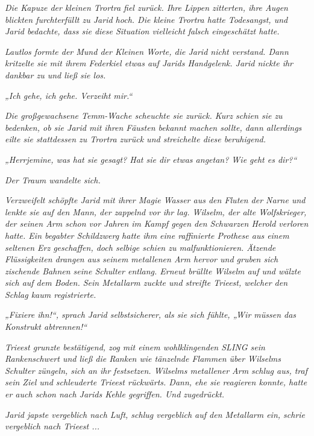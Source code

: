 \textit{Die Kapuze der kleinen Trortra fiel zurück. Ihre Lippen zitterten, ihre Augen blickten furchterfüllt zu Jarid hoch. Die kleine Trortra hatte Todesangst, und Jarid bedachte, dass sie diese Situation vielleicht falsch eingeschätzt hatte.}

\textit{Lautlos formte der Mund der Kleinen Worte, die Jarid nicht verstand. Dann kritzelte sie mit ihrem Federkiel etwas auf Jarids Handgelenk. Jarid nickte ihr dankbar zu und ließ sie los.}

\textit{„Ich gehe, ich gehe. Verzeiht mir.“}

\textit{Die großgewachsene Temm-Wache scheuchte sie zurück. Kurz schien sie zu bedenken, ob sie Jarid mit ihren Fäusten bekannt machen sollte, dann allerdings eilte sie stattdessen zu Trortra zurück und streichelte diese beruhigend.}

\textit{„Herrjemine, was hat sie gesagt? Hat sie dir etwas angetan? Wie geht es dir?“}



\textit{Der Traum wandelte sich.}






\textit{Verzweifelt schöpfte Jarid mit ihrer Magie Wasser aus den Fluten der Narne und lenkte sie auf den Mann, der zappelnd vor ihr lag. Wilselm, der alte Wolfskrieger, der seinen Arm schon vor Jahren im Kampf gegen den Schwarzen Herold verloren hatte. Ein begabter Schildzwerg hatte ihm eine raffinierte Prothese aus einem seltenen Erz geschaffen, doch selbige schien zu malfunktionieren. Ätzende Flüssigkeiten drangen aus seinem metallenen Arm hervor und gruben sich zischende Bahnen seine Schulter entlang. Erneut brüllte Wilselm auf und wälzte sich auf dem Boden. Sein Metallarm zuckte und streifte Trieest, welcher den Schlag kaum registrierte.}

\textit{„Fixiere ihn!“, sprach Jarid selbstsicherer, als sie sich fühlte, „Wir müssen das Konstrukt abtrennen!“}

\textit{Trieest grunzte bestätigend, zog mit einem wohlklingenden SLING sein Rankenschwert und ließ die Ranken wie tänzelnde Flammen über Wilselms Schulter züngeln, sich an ihr festsetzen. Wilselms metallener Arm schlug aus, traf sein Ziel und schleuderte Trieest rückwärts. Dann, ehe sie reagieren konnte, hatte er auch schon nach Jarids Kehle gegriffen. Und zugedrückt.}

\textit{Jarid japste vergeblich nach Luft, schlug vergeblich auf den Metallarm ein, schrie vergeblich nach Trieest ...}





